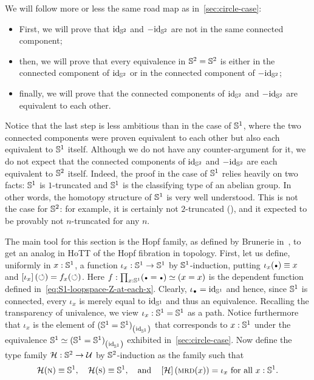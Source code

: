 \documentclass[english,a4paper]{lmcs}
\begin{document}
We will follow more or less the same road map as
in~\cref{sec:circle-case}:
\begin{itemize}
\item First, we will prove that $\mathord{\mathrm{id}}_{{\mathbb S^{2}}}$ and $-\mathord{\mathrm{id}}_{{\mathbb S^{2}}}$ are not in
  the same connected component;
\item then, we will prove that every equivalence in ${{\mathbb S^{2}}}={{\mathbb S^{2}}}$ is
  either in the connected component of $\mathord{\mathrm{id}}_{{\mathbb S^{2}}}$ or in the connected
  component of $-\mathord{\mathrm{id}}_{{\mathbb S^{2}}}$;
\item finally, we will prove that the connected components of $\mathord{\mathrm{id}}_{{\mathbb S^{2}}}$
  and $-\mathord{\mathrm{id}}_{{\mathbb S^{2}}}$ are equivalent to each other.
\end{itemize}
Notice that the last step is less ambitious than in the case of ${{\mathbb S^{1}}}$,
where the two connected components were proven equivalent to each
other but also each equivalent to ${{\mathbb S^{1}}}$ itself. Although we do not
have any counter-argument for it, we do not expect that the connected
components of $\mathord{\mathrm{id}}_{{\mathbb S^{2}}}$ and $-\mathord{\mathrm{id}}_{{\mathbb S^{2}}}$ are each equivalent to ${{\mathbb S^{2}}}$
itself. Indeed, the proof in the case of ${{\mathbb S^{1}}}$ relies heavily on two
facts: ${{\mathbb S^{1}}}$ is $1$-truncated and ${{\mathbb S^{1}}}$ is the classifying type of an
abelian group. In other words, the homotopy structure of ${{\mathbb S^{1}}}$ is very
well understood. This is not the case for ${{\mathbb S^{2}}}$: for example, it is
certainly not $2$-truncated (\cite{brunerie:thesis}), and it expected
to be provably not $n$-truncated for any $n$.

The main tool for this section is the Hopf family, as defined by Brunerie
in~\cite{brunerie:thesis}, to get an analog in HoTT of the Hopf
fibration in topology. First, let us define, uniformly in $x:{{\mathbb S^{1}}}$, a
function $\iota_x: {{\mathbb S^{1}}}\to{{\mathbb S^{1}}}$ by ${{\mathbb S^{1}}}$-induction, putting
$\iota_x(\base) \jdeq x$ and $\left[{\iota_x}\right](\mathord{\circlearrowleft}) = f_x(\mathord{\circlearrowleft})$.
Here $f\from \prod_{x\from\Sc} (\base=\base) \weq (x=x)$ is the
dependent function defined in~\cref{eq:S1-loopspace-Z-at-each-x}.
Clearly, $\iota_{\base}=\id_{\Sc}$ and hence, since ${{\mathbb S^{1}}}$ is connected,
every $\iota_x$ is merely equal to $\mathord{\mathrm{id}}_{{{\mathbb S^{1}}}}$ and thus an equivalence.
Recalling the transparency of univalence,
we view $\iota_x: {{\mathbb S^{1}}}={{\mathbb S^{1}}}$ as a path.
Notice furthermore that $\iota_x$ is the element
of ${({{\mathbb S^{1}}}={{\mathbb S^{1}}})}_{\left(\mathord{\mathrm{id}}_{{\mathbb S^{1}}}\right)}$ that corresponds to $x:{{\mathbb S^{1}}}$
under the equivalence ${{\mathbb S^{1}}} \simeq {({{\mathbb S^{1}}}={{\mathbb S^{1}}})}_{\left(\mathord{\mathrm{id}}_{{\mathbb S^{1}}}\right)}$
exhibited in~\cref{sec:circle-case}. Now define the type family
${\mathcal H}: {{\mathbb S^{2}}} \to \mathcal{U}$ by ${{\mathbb S^{2}}}$-induction as the family such that
\begin{displaymath}
  {\mathcal H}(\textsc{n}) \equiv {{\mathbb S^{1}}},\quad
  {\mathcal H}(\textsc{s}) \equiv {{\mathbb S^{1}}},\quad\text{and}\quad
  \left[{{\mathcal H}}\right] (\operatorname{\textsc{mrd}}(x)) = \iota_x\ \text{for all}\ x:{{\mathbb S^{1}}}.
\end{displaymath}
\end{document}

